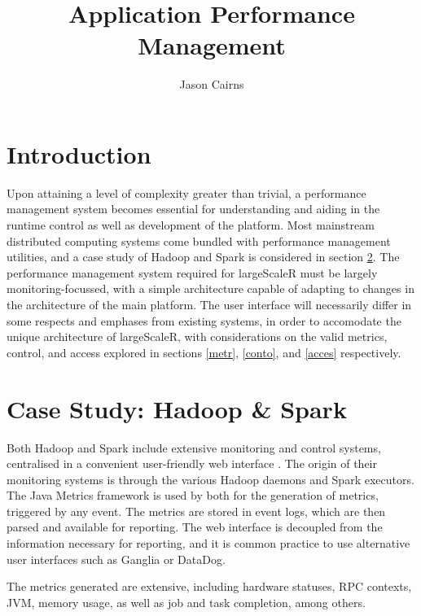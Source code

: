 \documentclass[a4paper,10pt]{article}
\begin{document}
\title{Application Performance Management}
\author{Jason Cairns}
  
\maketitle{}

\section{Introduction}

Upon attaining a level of complexity greater than trivial, a performance
management system becomes essential for understanding and aiding in the runtime
control as well as development of the platform.
Most mainstream distributed computing systems come bundled with performance
management utilities, and a case study of Hadoop and Spark is considered in
section \ref{hscs}.
The performance management system required for largeScaleR must be largely
monitoring-focussed, with a simple architecture capable of adapting to changes
in the architecture of the main platform.
The user interface will necessarily differ in some respects and emphases from
existing systems, in order to accomodate the unique architecture of
largeScaleR, with considerations on the valid metrics, control, and access
explored in sections \ref{metr}, \ref{conto}, and \ref{acces} respectively.

\section{Case Study: Hadoop \& Spark}\label{hscs}

Both Hadoop and Spark include extensive monitoring and control systems,
centralised in a convenient user-friendly web interface \cite{spark2021monitoring}.
The origin of their monitoring systems is through the various Hadoop daemons
and Spark executors.
The Java Metrics framework is used by both for the generation of metrics,
triggered by any event\cite{hadoop2021metrics}\cite{dropwizard2021metrics}.
The metrics are stored in event logs, which are then parsed and available for
reporting.
The web interface is decoupled from the information necessary for reporting,
and it is common practice to use alternative user interfaces such as Ganglia or
DataDog\cite{massie2012monitoring}\cite{datadog2021hdfs}\cite{datadog2021spark}.

The metrics generated are extensive, including hardware statuses, RPC contexts,
JVM, memory usage, as well as job and task completion, among others.
\end{document}
